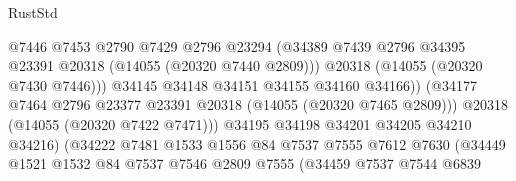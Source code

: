 \begin{lexlean}{RustStd}
\begin{coremodule}
                                          @7446
                                          @7453
                                          @2790
                                          @7429
                                          @2796
                                          @23294
                                          (@34389
                                            @7439
                                            @2796
                                            @34395
                                            @23391
                                            @20318
                                            (@14055 (@20320 @7440 @2809)))
                                          @20318
                                          (@14055 (@20320 @7430 @7446)))
                                        @34145
                                        @34148
                                        @34151
                                        @34155
                                        @34160
                                        @34166))
                                    (@34177
                                      @7464
                                      @2796
                                      @23377
                                      @23391
                                      @20318
                                      (@14055 (@20320 @7465 @2809)))
                                    @20318
                                    (@14055 (@20320 @7422 @7471)))
                                  @34195
                                  @34198
                                  @34201
                                  @34205
                                  @34210
                                  @34216)
                                (@34222
                                  @7481
                                  @1533
                                  @1556
                                  @84
                                  @7537
                                  @7555
                                  @7612
                                  @7630
                                  (@34449
                                    @1521
                                    @1532
                                    @84
                                    @7537
                                    @7546
                                    @2809
                                    @7555
                                    (@34459
                                      @7537
                                      @7544
                                      @6839

\end{coremodule}
\end{lexlean}
